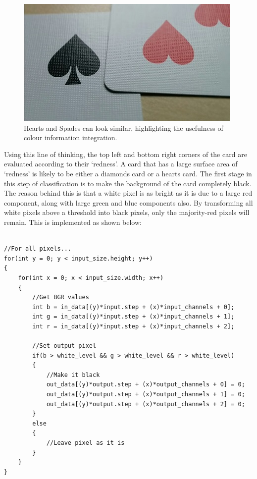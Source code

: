 \documentclass[a4paper,12pt,notitlepage]{article}
\begin{document}
		\begin{figure}[H]
			\centering
			\includegraphics[width=0.6\linewidth]{chris/image16}
			\caption{Hearts and Spades can look similar, highlighting the usefulness of colour information integration.}
			\label{fig:colours}
		\end{figure}

		Using this line of thinking, the top left and bottom right corners of the card are evaluated according to their `redness'. A card that has a large surface area of `redness' is likely to be either a diamonds card or a hearts card. The first stage in this step of classification is to make the background of the card completely black. The reason behind this is that a white pixel is as bright as it is due to a large red component, along with large green and blue components also. By transforming all white pixels above a threshold into black pixels, only the majority-red pixels will remain. This is implemented as shown below:
		
		\begin{lstlisting}

//For all pixels...
for(int y = 0; y < input_size.height; y++)
{
    for(int x = 0; x < input_size.width; x++)
    {
        //Get BGR values
        int b = in_data[(y)*input.step + (x)*input_channels + 0];
        int g = in_data[(y)*input.step + (x)*input_channels + 1];
        int r = in_data[(y)*input.step + (x)*input_channels + 2];

        //Set output pixel
        if(b > white_level && g > white_level && r > white_level)
        {
            //Make it black
            out_data[(y)*output.step + (x)*output_channels + 0] = 0;
            out_data[(y)*output.step + (x)*output_channels + 1] = 0;
            out_data[(y)*output.step + (x)*output_channels + 2] = 0;
        }
        else
        {
            //Leave pixel as it is
        }
    }
}
		\end{lstlisting}
\end{document}
